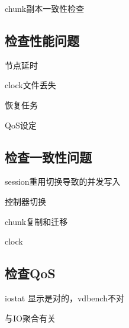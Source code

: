 chunk副本一致性检查

\subsection{检查性能问题}

节点延时

clock文件丢失

恢复任务

QoS设定

\subsection{检查一致性问题}

session重用切换导致的并发写入

控制器切换

chunk复制和迁移

clock

\subsection{检查QoS}

iostat 显示是对的，vdbench不对

与IO聚合有关
